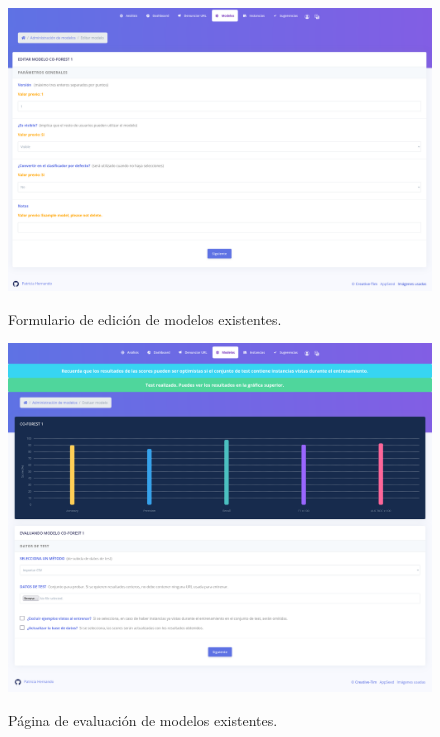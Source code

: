 \begin{figure}[h]
	\caption[Manual de usuario: editar modelo]{Formulario de edición de modelos existentes.}
	\centering
	\includegraphics[width=\textwidth]{../img/anexos/user_guide/5_edit_model}
	\label{e-5:edit-model}
\end{figure}

\begin{figure}[h]
	\caption[Manual de usuario: evaluar modelo]{Página de evaluación de modelos existentes.}
	\centering
	\includegraphics[width=\textwidth]{../img/anexos/user_guide/5_test_model}
	\label{e-5:test-model}
\end{figure}

